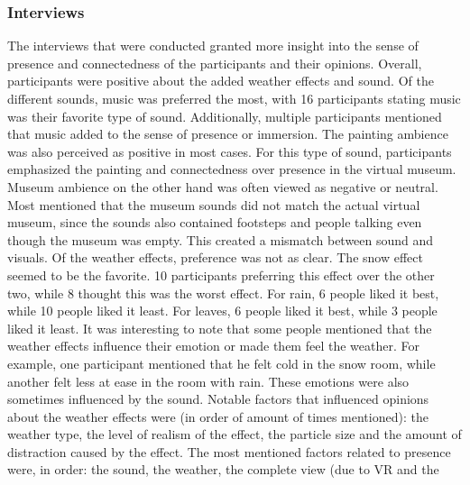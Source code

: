\documentclass[a4paper]{article}
\begin{document}
\subsubsection{Interviews}
The interviews that were conducted granted more insight into the sense of presence and connectedness of the participants and their opinions. Overall, participants were positive about the added weather effects and sound. Of the different sounds, music was preferred the most, with 16 participants stating music was their favorite type of sound. Additionally, multiple participants mentioned that music added to the sense of presence or immersion. The painting ambience was also perceived as positive in most cases. For this type of sound, participants emphasized the painting and connectedness over presence in the virtual museum. Museum ambience on the other hand was often viewed as negative or neutral. Most mentioned that the museum sounds did not match the actual virtual museum, since the sounds also contained footsteps and people talking even though the museum was empty. This created a mismatch between sound and visuals. Of the weather effects, preference was not as clear. The snow effect seemed to be the favorite. 10 participants preferring this effect over the other two, while 8 thought this was the worst effect. For rain, 6 people liked it best, while 10 people liked it least. For leaves, 6 people liked it best, while 3 people liked it least. It was interesting to note that some people mentioned that the weather effects influence their emotion or made them feel the weather. For example, one participant mentioned that he felt cold in the snow room, while another felt less at ease in the room with rain. These emotions were also sometimes influenced by the sound. Notable factors that influenced opinions about the weather effects were (in order of amount of times mentioned): the weather type, the level of realism of the effect, the particle size and the amount of distraction caused by the effect. The most mentioned factors related to presence were, in order: the sound, the weather, the complete view (due to VR and the 
\end{document}
